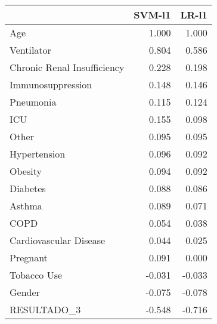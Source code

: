 \begin{tabular}{lrr}
\toprule
{} &  SVM-l1 &  LR-l1 \\
\midrule
Age                         &   1.000 &  1.000 \\
Ventilator                  &   0.804 &  0.586 \\
Chronic Renal Insufficiency &   0.228 &  0.198 \\
Immunosuppression           &   0.148 &  0.146 \\
Pneumonia                   &   0.115 &  0.124 \\
ICU                         &   0.155 &  0.098 \\
Other                       &   0.095 &  0.095 \\
Hypertension                &   0.096 &  0.092 \\
Obesity                     &   0.094 &  0.092 \\
Diabetes                    &   0.088 &  0.086 \\
Asthma                      &   0.089 &  0.071 \\
COPD                        &   0.054 &  0.038 \\
Cardiovascular Disease      &   0.044 &  0.025 \\
Pregnant                    &   0.091 &  0.000 \\
Tobacco Use                 &  -0.031 & -0.033 \\
Gender                      &  -0.075 & -0.078 \\
RESULTADO\_3                 &  -0.548 & -0.716 \\
\bottomrule
\end{tabular}
